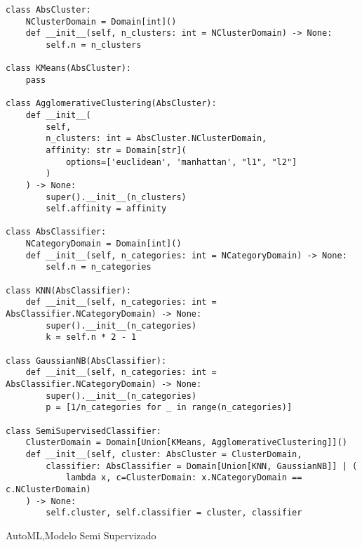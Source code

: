 \begin{listing}[!ht]
    \begin{verbatim}
class AbsCluster:
    NClusterDomain = Domain[int]()
    def __init__(self, n_clusters: int = NClusterDomain) -> None:
        self.n = n_clusters

class KMeans(AbsCluster):
    pass

class AgglomerativeClustering(AbsCluster):
    def __init__(
        self,
        n_clusters: int = AbsCluster.NClusterDomain,
        affinity: str = Domain[str](
            options=['euclidean', 'manhattan', "l1", "l2"]
        )
    ) -> None:
        super().__init__(n_clusters)
        self.affinity = affinity

class AbsClassifier:
    NCategoryDomain = Domain[int]()
    def __init__(self, n_categories: int = NCategoryDomain) -> None:
        self.n = n_categories

class KNN(AbsClassifier):
    def __init__(self, n_categories: int = AbsClassifier.NCategoryDomain) -> None:
        super().__init__(n_categories)
        k = self.n * 2 - 1

class GaussianNB(AbsClassifier):
    def __init__(self, n_categories: int = AbsClassifier.NCategoryDomain) -> None:
        super().__init__(n_categories)
        p = [1/n_categories for _ in range(n_categories)]

class SemiSupervisedClassifier:
    ClusterDomain = Domain[Union[KMeans, AgglomerativeClustering]]()
    def __init__(self, cluster: AbsCluster = ClusterDomain,
        classifier: AbsClassifier = Domain[Union[KNN, GaussianNB]] | (
            lambda x, c=ClusterDomain: x.NCategoryDomain == c.NClusterDomain)
    ) -> None:
        self.cluster, self.classifier = cluster, classifier
    \end{verbatim}
    \caption{AutoML,Modelo Semi Supervizado}
    \label{lst:automl}
\end{listing}